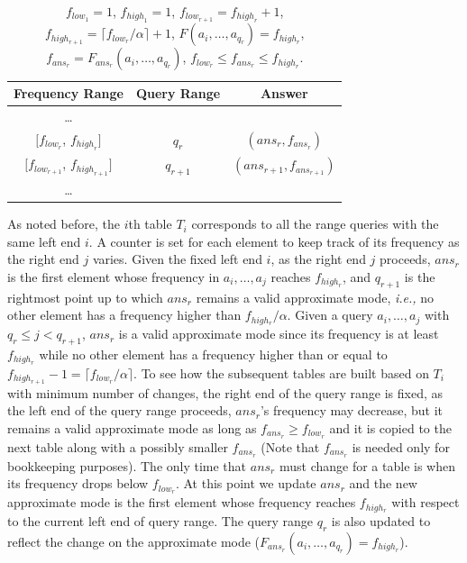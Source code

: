 \documentclass{llncs}
\begin{document}
\begin{table}[htb]
\begin{center}
{\tt
\begin{tabular}{|c|c|c|}\hline
Frequency Range & Query Range    & Answer \\\hline\hline  
\ldots & & \\\hline
$[f_{{low}_r}$, $f_{{high}_r}]$ & $q_r$  & $(ans_r,f_{{ans}_r})$ \\\hline
$[f_{{low}_{r+1}}$, $f_{{high}_{r+1}}]$ & $q_{r+1}$ & $(ans_{r+1},f_{{ans}_{r+1}})$ \\\hline
\ldots & &
\\\hline 
\end{tabular}
}\caption{\label{lookup table general form}
$f_{{low}_1}=1$, $f_{{high}_1}=1$, 
$f_{{low}_{r+1}} = f_{{high}_{r}} + 1$, 
$f_{{high}_{r+1}}=\lceil f_{low_{r}}/\alpha \rceil + 1$,
$F(a_i,\ldots,a_{q_r})=f_{{high}_r}$, $f_{{ans}_{r}}=F_{{ans}_r}(a_i,\ldots,a_{q_r})$, 
$f_{{low}_{r}} \leq f_{{ans}_{r}} \leq  f_{{high}_{r}}$.
}
\end{center}
\end{table}
As noted before, the $i$th table $T_i$ corresponds to all the range
queries with the same left end $i$. A counter is set for each
element to keep track of its frequency as the right 
end $j$ varies. Given the fixed left end $i$, as the right end $j$
proceeds, $ans_r$ is the first element whose frequency in
$a_i,\ldots,a_j$ reaches $f_{high_r}$, and $q_{r+1}$ is the 
rightmost point up to which $ans_r$ remains a valid approximate 
mode, {\it i.e.,} no other element has a frequency higher than
$f_{high_r}/\alpha$. 
Given a query $a_i,\ldots,a_j$ with $q_r \leq j < q_{r+1}$, 
$ans_r$ is a valid approximate mode since its frequency is at least $f_{high_r}$ while no other 
element has a frequency higher than or equal to $f_{high_{r+1}}-1 =
\lceil f_{low_r}/\alpha \rceil$. To see how the subsequent tables are built based
on $T_i$ with minimum number of changes, the right end of the query
range is fixed, as the left
end of the query range proceeds, $ans_r$'s frequency may decrease, but 
it remains a valid approximate mode as long as $f_{ans_r} \ge
f_{low_r}$ and it is copied to the next table along with a possibly
smaller $f_{ans_r}$ (Note that $f_{ans_r}$ is needed only for 
bookkeeping purposes). The only time that
 $ans_r$ must change for a table is when its frequency 
drops below $f_{low_r}$. At this point we update 
$ans_r$ and the new approximate mode is the first element 
whose frequency reaches $f_{high_r}$ with respect to the 
current left end of query range. 
The query range $q_r$ is also updated to reflect the change on the approximate mode 
($F_{ans_r}(a_i,\ldots,a_{q_r}) = f_{high_r}$).  
\end{document}
